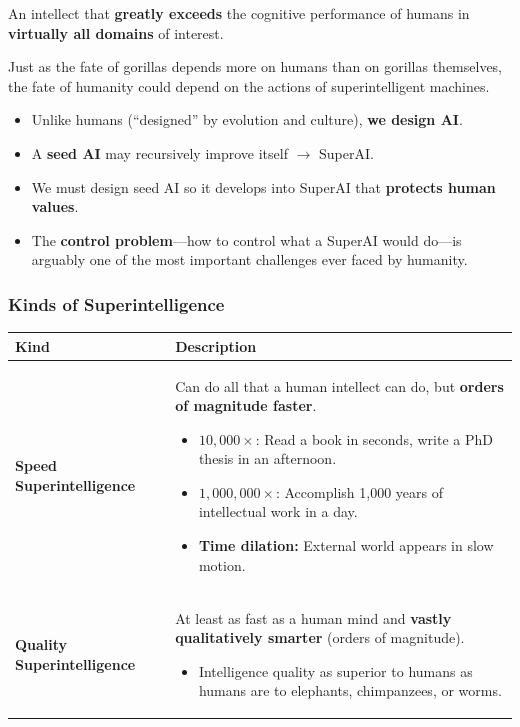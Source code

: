 \begin{defbox}[Superintelligence]
An intellect that \textbf{greatly exceeds} the cognitive performance of humans in \textbf{virtually all domains} of interest.

Just as the fate of gorillas depends more on humans than on gorillas themselves, the fate of humanity could depend on the actions of superintelligent machines.
\end{defbox}

\begin{tipbox}
\begin{itemize}
  \item Unlike humans (``designed'' by evolution and culture), \textbf{we design AI}.
  \item A \textbf{seed AI} may recursively improve itself $\to$ SuperAI.
  \item We must design seed AI so it develops into SuperAI that \textbf{protects human values}.
  \item The \textbf{control problem}---how to control what a SuperAI would do---is arguably one of the most important challenges ever faced by humanity.
\end{itemize}
\end{tipbox}

\separator

\subsubsection{Kinds of Superintelligence}

\begin{center}
\renewcommand{\arraystretch}{1.3}
\begin{tabular}{@{} l p{10cm} @{}}
\toprule
\textbf{Kind} & \textbf{Description} \\
\midrule
\textbf{Speed Superintelligence} & Can do all that a human intellect can do, but \textbf{orders of magnitude faster}.
\begin{itemize}
  \item $10,000\times$: Read a book in seconds, write a PhD thesis in an afternoon.
  \item $1,000,000\times$: Accomplish 1,000 years of intellectual work in a day.
  \item \textbf{Time dilation:} External world appears in slow motion.
\end{itemize} \\
\textbf{Quality Superintelligence} & At least as fast as a human mind and \textbf{vastly qualitatively smarter} (orders of magnitude).
\begin{itemize}
  \item Intelligence quality as superior to humans as humans are to elephants, chimpanzees, or worms.
\end{itemize} \\
\bottomrule
\end{tabular}
\end{center}

